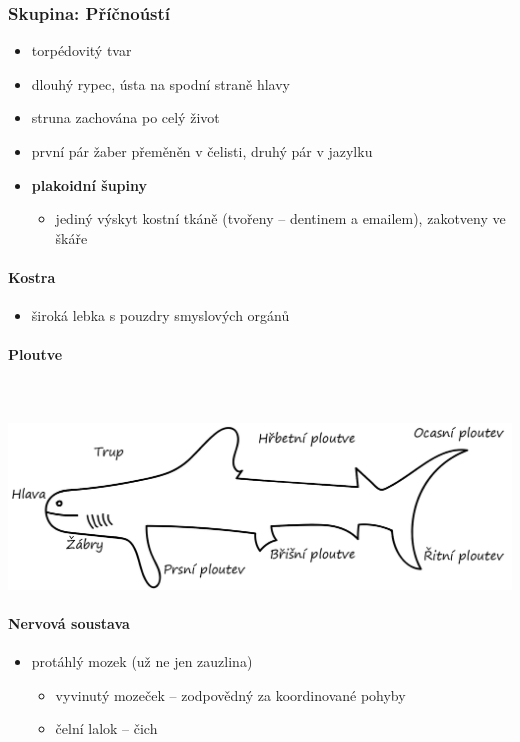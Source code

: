\subsubsection{Skupina: Příčnoústí}
\begin{itemize}
\item torpédovitý tvar
\item dlouhý rypec, ústa na spodní straně hlavy
\item struna zachována po celý život
\item první pár žaber přeměněn v čelisti, druhý pár v jazylku
\item \textbf{plakoidní šupiny}
\begin{itemize}
\item jediný výskyt kostní tkáně (tvořeny -- dentinem a emailem), zakotveny ve škáře
\end{itemize}
\end{itemize}

\paragraph{Kostra}
\begin{itemize}
\item široká lebka s pouzdry smyslových orgánů
\end{itemize}

\paragraph{Ploutve}\mbox{} \\ \mbox{} \\
\includegraphics[width=\textwidth]{pictures/ploutve.png}


\paragraph{Nervová soustava}
\begin{itemize}
\item protáhlý mozek (už ne jen zauzlina)
	\begin{itemize}
	\item vyvinutý mozeček -- zodpovědný za koordinované pohyby
	\item čelní lalok -- čich
	\end{itemize}
\end{itemize}

